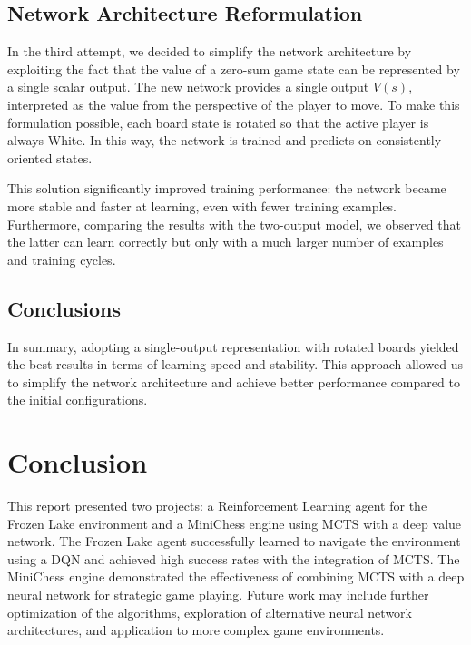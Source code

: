 \documentclass{report}
\begin{document}
\section{Network Architecture Reformulation}
In the third attempt, we decided to simplify the network architecture by exploiting the fact that the value of a zero-sum game state can be represented by a single scalar output. The new network provides a single output $V(s)$, interpreted as the value from the perspective of the player to move. To make this formulation possible, each board state is rotated so that the active player is always White. In this way, the network is trained and predicts on consistently oriented states.

This solution significantly improved training performance: the network became more stable and faster at learning, even with fewer training examples. Furthermore, comparing the results with the two-output model, we observed that the latter can learn correctly but only with a much larger number of examples and training cycles.

\section{Conclusions}
In summary, adopting a single-output representation with rotated boards yielded the best results in terms of learning speed and stability. This approach allowed us to simplify the network architecture and achieve better performance compared to the initial configurations.

\chapter{Conclusion}
This report presented two projects: a Reinforcement Learning agent for the Frozen Lake environment and a MiniChess engine using MCTS with a deep value network. The Frozen Lake agent successfully learned to navigate the environment using a DQN and achieved high success rates with the integration of MCTS. The MiniChess engine demonstrated the effectiveness of combining MCTS with a deep neural network for strategic game playing. Future work may include further optimization of the algorithms, exploration of alternative neural network architectures, and application to more complex game environments.
\end{document}
